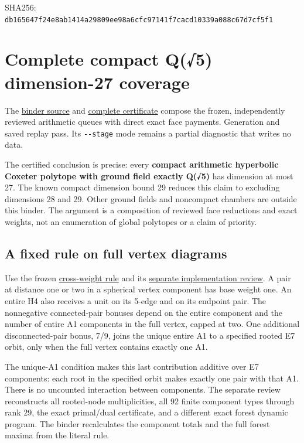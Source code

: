 \documentclass[
  10pt,
]{report}
\begin{document}
SHA256:
\nolinkurl{db165647f24e8ab1414a29809ee98a6cfc97141f7cacd10339a088c67d7cf5f1}

\chapter{Complete compact Q(√5) dimension-27
coverage}\label{complete-compact-q5-dimension-27-coverage}

The
\href{../scripts/fresh_sqrt5_dimension27_coverage_20261015.py}{binder
source} and
\href{fresh_sqrt5_dimension27_coverage_20261015.json}{complete
certificate} compose the frozen, independently reviewed arithmetic
queues with direct exact face payments. Generation and saved replay
pass. Its \texttt{-\/-stage} mode remains a partial diagnostic that
writes no data.

The certified conclusion is precise: every \textbf{compact arithmetic
hyperbolic Coxeter polytope with ground field exactly Q(√5)} has
dimension at most 27. The known compact dimension bound 29 reduces this
claim to excluding dimensions 28 and 29. Other ground fields and
noncompact chambers are outside this binder. The argument is a
composition of reviewed face reductions and exact weights, not an
enumeration of global polytopes or a claim of priority.

\section{A fixed rule on full vertex
diagrams}\label{a-fixed-rule-on-full-vertex-diagrams}

Use the frozen
\href{fresh_sqrt5_parameter_weight_stress_20261015_cross.md}{cross-weight
rule} and its
\href{fresh_sqrt5_parameter_weight_stress_20261015_cross_review.md}{separate
implementation review}. A pair at distance one or two in a spherical
vertex component has base weight one. An entire H4 also receives a unit
on its 5-edge and on its endpoint pair. The nonnegative connected-pair
bonuses depend on the entire component and the number of entire A1
components in the full vertex, capped at two. One additional
disconnected-pair bonus, 7/9, joins the unique entire A1 to a specified
rooted E7 orbit, only when the full vertex contains exactly one A1.

The unique-A1 condition makes this last contribution additive over E7
components: each root in the specified orbit makes exactly one pair with
that A1. There is no uncounted interaction between components. The
separate review reconstructs all rooted-node multiplicities, all 92
finite component types through rank 29, the exact primal/dual
certificate, and a different exact forest dynamic program. The binder
recalculates the component totals and the full forest maxima from the
literal rule.
\end{document}
